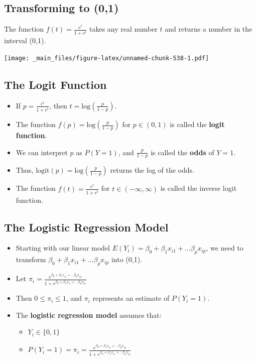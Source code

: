 \documentclass[]{book}
\providecommand{\tightlist}{%
  \setlength{\itemsep}{0pt}\setlength{\parskip}{0pt}}
\begin{document}
\subsection{Transforming to (0,1)}\label{transforming-to-01}

The function \(f(t)=\frac{e^t}{1+e^{t}}\) takes any real number \(t\)
and returns a number in the interval (0,1).

\texttt{[image: \_main\_files/figure-latex/unnamed-chunk-538-1.pdf]}

\subsection{The Logit Function}\label{the-logit-function}

\begin{itemize}
\item
  If \(p=\frac{e^t}{1+e^t}\), then
  \(t=\text{log}\left(\frac{p}{1-p} \right)\).
\item
  The function \(f(p) = \text{log}\left(\frac{p}{1-p} \right)\) for
  \(p \in (0,1)\) is called the \textbf{logit function}.
\item
  We can interpret \(p\) as \(P(Y=1)\), and \(\frac{p}{1-p}\) is called
  the \textbf{odds} of \(Y=1\).
\item
  Thus, \(\text{logit}(p) = \text{log}\left(\frac{p}{1-p} \right)\)
  returns the log of the odds.
\item
  The function \(f(t)=\frac{e^t}{1+e^t}\) for
  \(t \in (-\infty, \infty)\) is called the inverse logit function.
\end{itemize}

\subsection{The Logistic Regression
Model}\label{the-logistic-regression-model}

\begin{itemize}
\item
  Starting with our linear model
  \(E(Y_i) = \beta_0+\beta_1x_{i1} + \ldots \beta_px_{ip}\), we need to
  transform \(\beta_0+\beta_1x_{i1} + \ldots \beta_px_{ip}\) into (0,1).
\item
  Let
  \(\pi_i = \frac{e^{\beta_0+\beta_1x_{i1} + \ldots \beta_px_{ip}}}{1+e^{\beta_0+\beta_1x_{i1} + \ldots \beta_px_{ip}}}\)
\item
  Then \(0 \leq \pi_i \leq 1\), and \(\pi_i\) represents an estimate of
  \(P(Y_i=1)\).
\item
  The \textbf{logistic regression model} assumes that:

  \begin{itemize}
  \tightlist
  \item
    \(Y_i \in \{0,1\}\)\\
  \item
    \(P(Y_i=1) = \pi_i=\frac{e^{\beta_0+\beta_1x_{i1} + \ldots \beta_px_{ip}}}{1+e^{\beta_0+\beta_1x_{i1} + \ldots \beta_px_{ip}}}\)
  \end{itemize}
\end{itemize}
\end{document}
